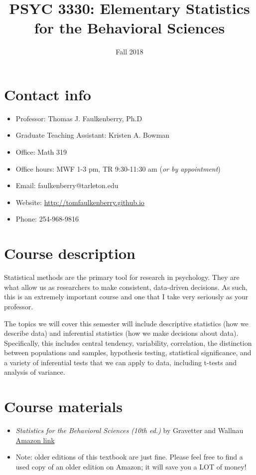 \documentclass[10pt]{article}
\date{Fall 2018}
\title{PSYC 3330: Elementary Statistics for the Behavioral Sciences}
\begin{document}
\maketitle

\section*{Contact info}
\label{sec:org7d2fdf4}
\begin{itemize}
\item Professor: Thomas J. Faulkenberry, Ph.D
\item Graduate Teaching Assistant: Kristen A. Bowman
\item Office: Math 319
\item Office hours: MWF 1-3 pm, TR 9:30-11:30 am (\emph{or by appointment})
\item Email: faulkenberry@tarleton.edu
\item Website: \url{http://tomfaulkenberry.github.io}
\item Phone: 254-968-9816
\end{itemize}

\section*{Course description}
\label{sec:orgd8fcc19}

Statistical methods are the primary tool for research in psychology.  
They are what allow us as researchers to make consistent, data-driven 
decisions.  As such, this is an extremely important course and one that I 
take very seriously as your professor.

The topics we will cover this semester will include descriptive statistics 
(how we describe data) and inferential statistics (how we make decisions 
about data).  Specifically, this includes central tendency, variability, 
correlation, the distinction between populations and samples, hypothesis 
testing, statistical significance, and a variety of inferential tests 
that we can apply to data, including t-tests and analysis of variance.

\section*{Course materials}
\label{sec:orgffcb17d}
\begin{itemize}
\item \emph{Statistics for the Behavioral Sciences (10th ed.)} by Gravetter and Wallnau \href{http://www.amazon.com/Statistics-Behavioral-Sciences-MindTap-Psychology/dp/1305504917/}{Amazon link}
\item Note:  older editions of this textbook are just fine.  Please feel free to find a used copy of an older edition on Amazon; it will save you a LOT of money!
\end{itemize}
\end{document}
